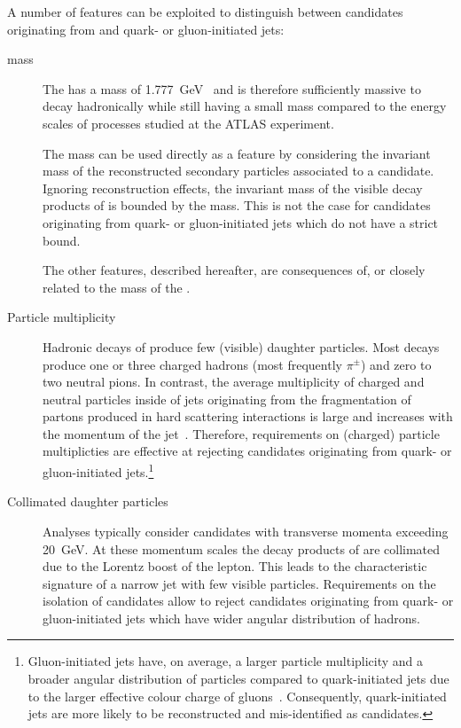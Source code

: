 A number of features can be exploited to distinguish between
\tauhadvis candidates originating from \tauhad and quark- or
gluon-initiated jets:
\begin{description}

\item[\taulepton mass] The \taulepton has a mass of
  \SI{1.777}{\GeV}~\cite{pdg2020} and is therefore sufficiently
  massive to decay hadronically while still having a small mass
  compared to the energy scales of processes studied at the ATLAS
  experiment.

  The \taulepton mass can be used directly as a feature by considering
  the invariant mass of the reconstructed secondary particles
  associated to a \tauhadvis candidate. Ignoring reconstruction
  effects, the invariant mass of the visible decay products of \tauhad
  is bounded by the \taulepton mass. This is not the case for
  \tauhadvis candidates originating from quark- or gluon-initiated
  jets which do not have a strict bound.

  The other features, described hereafter, are consequences of, or
  closely related to the mass of the \taulepton.

\item[Particle multiplicity] Hadronic decays of \tauleptons produce
  few (visible) daughter particles. Most decays produce one or three
  charged hadrons (most frequently $\pi^{\pm}$) and zero to two
  neutral pions.
  In contrast, the average multiplicity of charged and neutral
  particles inside of jets originating from the fragmentation of
  partons produced in hard scattering interactions is large and
  increases with the momentum of the
  jet~\cite{Ellis:1996mzs,STDM-2015-12}. Therefore, requirements on
  (charged) particle multiplicties are effective at rejecting
  \tauhadvis candidates originating from quark- or gluon-initiated
  jets.\footnote{Gluon-initiated jets have, on average, a larger
    particle multiplicity and a broader angular distribution of
    particles compared to quark-initiated jets due to the larger
    effective colour charge of
    gluons~\cite{Ellis:1996mzs}. Consequently, quark-initiated jets
    are more likely to be reconstructed and mis-identified as
    \tauhadvis candidates.}

\item[Collimated daughter particles] Analyses typically consider
  \tauhadvis candidates with transverse momenta exceeding
  \SI{20}{\GeV}. At these momentum scales the decay products of
  \tauleptons are collimated due to the Lorentz boost of the
  lepton. This leads to the characteristic signature of a narrow jet
  with few visible particles. Requirements on the isolation of
  \tauhadvis candidates allow to reject candidates originating from
  quark- or gluon-initiated jets which have wider angular distribution
  of hadrons.


\end{description}
